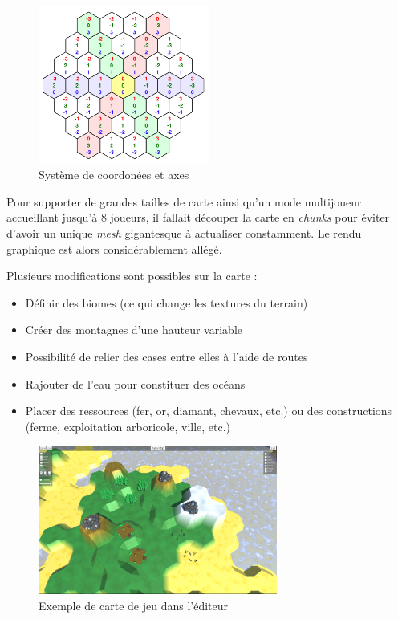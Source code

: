 \documentclass[12pt]{report}
\begin{document}
\begin{figure}[H]
    \centering
    \includegraphics[width=0.5\textwidth]{../report_1/img/cubic_coordinates}
    \caption*{Système de coordonées et axes}
\end{figure}

Pour supporter de grandes tailles de carte ainsi qu’un mode multijoueur
accueillant jusqu’à 8 joueurs, il fallait découper la carte en \textit{chunks}
pour éviter d’avoir un unique \textit{mesh} gigantesque à actualiser
constamment. Le rendu graphique est alors considérablement allégé.

Plusieurs modifications sont possibles sur la carte :

\begin{itemize}
    \item Définir des biomes (ce qui change les textures du terrain)
    \item Créer des montagnes d’une hauteur variable
    \item Possibilité de relier des cases entre elles à l’aide de routes
    \item Rajouter de l’eau pour constituer des océans
    \item Placer des ressources (fer, or, diamant, chevaux, etc.) ou des
        constructions (ferme, exploitation arboricole, ville, etc.)
\end{itemize}

\begin{figure}[H]
    \centering
    \includegraphics[width=0.7\textwidth]{map_example}
    \caption*{Exemple de carte de jeu dans l'éditeur}
\end{figure}
\end{document}
